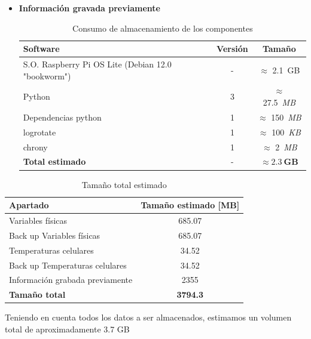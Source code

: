 \begin{itemize}
      \item \textbf{Información gravada previamente}

      \begin{table}[H]
      \centering
      \begin{tabular}{|l|c|c|}
      \hline
      \textbf{Software} & \textbf{Versión} & \textbf{Tamaño} \\
      \hline
      S.O. Raspberry Pi OS Lite (Debian 12.0 "bookworm") & - & $\approx$ 2.1~GB \\
      Python                   & 3 & $\approx$ 27.5~\textit{MB} \\
      Dependencias python      & 1 & $\approx$ 150~\textit{MB} \\
      logrotate                & 1 & $\approx$ 100~\textit{KB} \\
      chrony                   & 1 & $\approx$ 2~\textit{MB} \\
      \hline
      \textbf{Total estimado}  & - & $\boldsymbol{\approx 2.3~GB}$ \\
      \hline
      \end{tabular}
      \caption{Consumo de almacenamiento de los componentes}
      \label{tab:almacenamiento_componentes}
      \end{table}
  
    \end{itemize}

    \begin{table}[H]
    \centering
    \begin{tabular}{|l|c|}
    \hline
    \textbf{Apartado} & \textbf{Tamaño estimado [MB]} \\
    \hline
    Variables físicas              & 685.07 \\
    Back up Variables físicas      & 685.07 \\
    Temperaturas celulares         & 34.52  \\
    Back up Temperaturas celulares & 34.52  \\
    Información grabada previamente & 2355 \\
    \hline
    \textbf{Tamaño total}          & \textbf{3794.3} \\
    \hline
    \end{tabular}
    \caption{Tamaño total estimado}
    \label{tab:tamano_total_estimado}
    \end{table}

    Teniendo en cuenta todos los datos a ser almacenados, estimamos un volumen total de
    aproximadamente 3.7 GB

